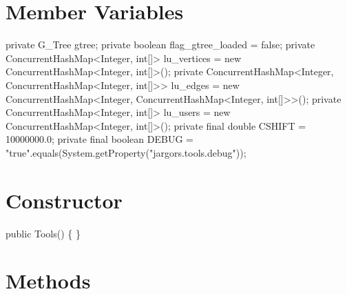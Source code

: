 \section{Member Variables}
\nwenddocs{}\endmoddef{}
private G_Tree gtree;
private boolean flag_gtree_loaded = false;
private ConcurrentHashMap<Integer, int[]> lu_vertices = new ConcurrentHashMap<Integer, int[]>();
private ConcurrentHashMap<Integer,
    ConcurrentHashMap<Integer, int[]>>    lu_edges    = new ConcurrentHashMap<Integer, ConcurrentHashMap<Integer, int[]>>();
private ConcurrentHashMap<Integer, int[]> lu_users    = new ConcurrentHashMap<Integer, int[]>();
private final double CSHIFT = 10000000.0;
private final boolean DEBUG = "true".equals(System.getProperty("jargors.tools.debug"));
\nwendcode{}\nwdocspar

\section{Constructor}
\nwenddocs{}\endmoddef{}
public Tools() \{ \}
\nwendcode{}\nwdocspar

\section{Methods}

